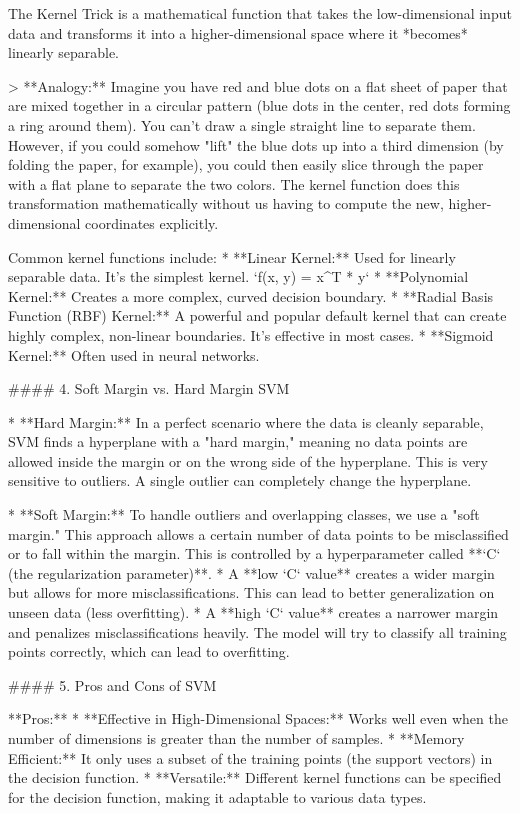 \documentclass{article}
\begin{document}
The Kernel Trick is a mathematical function that takes the low-dimensional input data and transforms it into a higher-dimensional space where it *becomes* linearly separable.

> **Analogy:** Imagine you have red and blue dots on a flat sheet of paper that are mixed together in a circular pattern (blue dots in the center, red dots forming a ring around them). You can't draw a single straight line to separate them. However, if you could somehow "lift" the blue dots up into a third dimension (by folding the paper, for example), you could then easily slice through the paper with a flat plane to separate the two colors. The kernel function does this transformation mathematically without us having to compute the new, higher-dimensional coordinates explicitly.

Common kernel functions include:
*   **Linear Kernel:** Used for linearly separable data. It's the simplest kernel. `f(x, y) = x^T * y`
*   **Polynomial Kernel:** Creates a more complex, curved decision boundary.
*   **Radial Basis Function (RBF) Kernel:** A powerful and popular default kernel that can create highly complex, non-linear boundaries. It's effective in most cases.
*   **Sigmoid Kernel:** Often used in neural networks.

#### 4. Soft Margin vs. Hard Margin SVM

*   **Hard Margin:** In a perfect scenario where the data is cleanly separable, SVM finds a hyperplane with a "hard margin," meaning no data points are allowed inside the margin or on the wrong side of the hyperplane. This is very sensitive to outliers. A single outlier can completely change the hyperplane.

*   **Soft Margin:** To handle outliers and overlapping classes, we use a "soft margin." This approach allows a certain number of data points to be misclassified or to fall within the margin. This is controlled by a hyperparameter called **`C` (the regularization parameter)**.
    *   A **low `C` value** creates a wider margin but allows for more misclassifications. This can lead to better generalization on unseen data (less overfitting).
    *   A **high `C` value** creates a narrower margin and penalizes misclassifications heavily. The model will try to classify all training points correctly, which can lead to overfitting.

#### 5. Pros and Cons of SVM

**Pros:**
*   **Effective in High-Dimensional Spaces:** Works well even when the number of dimensions is greater than the number of samples.
*   **Memory Efficient:** It only uses a subset of the training points (the support vectors) in the decision function.
*   **Versatile:** Different kernel functions can be specified for the decision function, making it adaptable to various data types.
\end{document}
